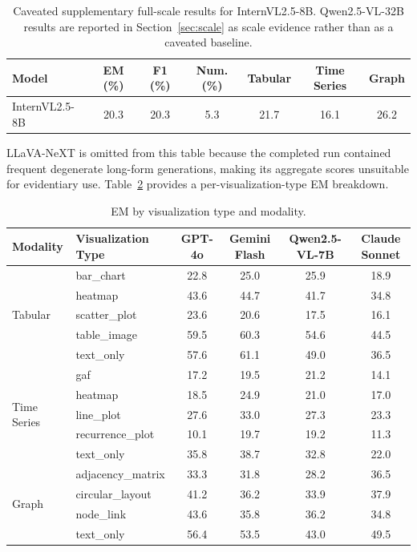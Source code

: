 \documentclass{article}
\begin{document}
\begin{table}[h]
\centering
\small
\caption{Caveated supplementary full-scale results for InternVL2.5-8B. Qwen2.5-VL-32B results are reported in Section~\ref{sec:scale} as scale evidence rather than as a caveated baseline.}
\label{tab:local_supp}
\begin{tabular}{lcccccc}
\toprule
Model & EM (\%) & F1 (\%) & Num. (\%) & Tabular & Time Series & Graph \\
\midrule
InternVL2.5-8B & 20.3 & 20.3 & 5.3 & 21.7 & 16.1 & 26.2 \\
\bottomrule
\end{tabular}
\end{table}
LLaVA-NeXT is omitted from this table because the completed run contained frequent degenerate long-form generations, making its aggregate scores unsuitable for evidentiary use. Table~\ref{tab:fullviz} provides a per-visualization-type EM breakdown.

\begin{table}[h]
\centering
\small
\caption{EM by visualization type and modality.}
\label{tab:fullviz}
\begin{tabular}{llcccc}
\toprule
Modality & Visualization Type & GPT-4o & Gemini Flash & Qwen2.5-VL-7B & Claude Sonnet \\
\midrule
\multirow{5}{*}{Tabular} & bar\_chart & 22.8 & 25.0 & 25.9 & 18.9 \\
 & heatmap & 43.6 & 44.7 & 41.7 & 34.8 \\
 & scatter\_plot & 23.6 & 20.6 & 17.5 & 16.1 \\
 & table\_image & 59.5 & 60.3 & 54.6 & 44.5 \\
 & text\_only & 57.6 & 61.1 & 49.0 & 36.5 \\
\midrule
\multirow{5}{*}{Time Series} & gaf & 17.2 & 19.5 & 21.2 & 14.1 \\
 & heatmap & 18.5 & 24.9 & 21.0 & 17.0 \\
 & line\_plot & 27.6 & 33.0 & 27.3 & 23.3 \\
 & recurrence\_plot & 10.1 & 19.7 & 19.2 & 11.3 \\
 & text\_only & 35.8 & 38.7 & 32.8 & 22.0 \\
\midrule
\multirow{4}{*}{Graph} & adjacency\_matrix & 33.3 & 31.8 & 28.2 & 36.5 \\
 & circular\_layout & 41.2 & 36.2 & 33.9 & 37.9 \\
 & node\_link & 43.6 & 35.8 & 36.2 & 34.8 \\
 & text\_only & 56.4 & 53.5 & 43.0 & 49.5 \\
\bottomrule
\end{tabular}
\end{table}
\end{document}
